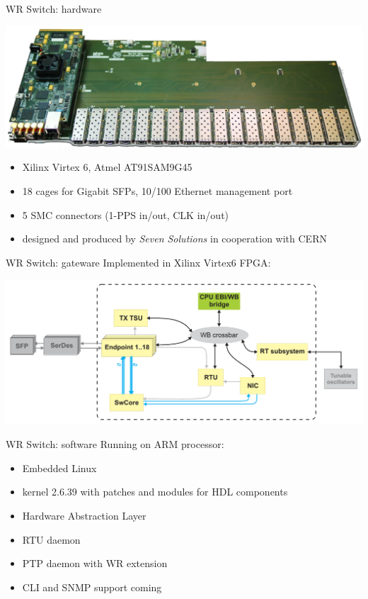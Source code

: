 \documentclass[compress,red]{beamer}
\begin{document}
\begin{frame}{WR Switch: hardware}
	\begin{center}
	\includegraphics[width=.7\textwidth]{switch/scb_backplane.png}
	\end{center}
	\begin{itemize}
	\item Xilinx Virtex 6, Atmel AT91SAM9G45
	\item 18 cages for Gigabit SFPs, 10/100 Ethernet management port
	\item 5 SMC connectors (1-PPS in/out, CLK in/out)
	\item designed and produced by \emph{Seven Solutions} in cooperation with CERN
	\end{itemize}
\end{frame}

\begin{frame}{WR Switch: gateware}
	Implemented in Xilinx Virtex6 FPGA:
	\begin{center}
	\includegraphics[width=.9\textwidth]{switch/switch_hdl.pdf}
	\end{center}
\end{frame}

\begin{frame}{WR Switch: software}
	Running on ARM processor:
	\begin{itemize}
	\item Embedded Linux
	\item kernel 2.6.39 with patches and modules for HDL components
	\item Hardware Abstraction Layer
	\item RTU daemon
	\item PTP daemon with WR extension
	\item CLI and SNMP support coming
	\end{itemize}
\end{frame}
\end{document}
